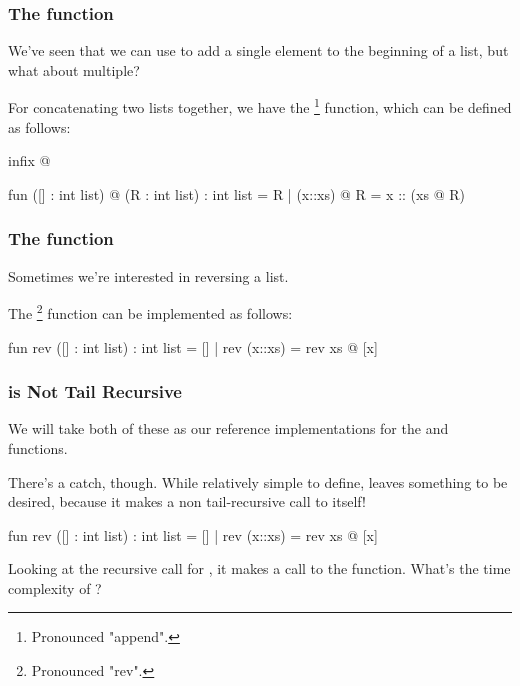 \documentclass[aspectratio=169, handout]{beamer}
\begin{document}


\begin{frame}[fragile]
  \frametitle{The  function}

  We've seen that we can use \code{::} to add a single element to the beginning of a list,
  but what about multiple?

  \pause
  \vspace{\fill}

  For concatenating two lists together, we have the \footnote{Pronounced "append".} function, which
  can be defined as follows:

  \pause
  \begin{codeblock}
    infix @

    fun ([] : int list) @ (R : int list) : int list = R
      | (x::xs) @ R = x :: (xs @ R)
  \end{codeblock}
\end{frame}

\begin{frame}[fragile]
  \frametitle{The  function}

  Sometimes we're interested in reversing a list.

  \pause
  \vspace{\fill}

  The \footnote{Pronounced "rev".} function can be implemented as follows:

  \pause
  \begin{codeblock}
    fun rev ([] : int list) : int list = []
      | rev (x::xs) = rev xs @ [x]
  \end{codeblock}
\end{frame}

\begin{frame}[fragile]
  \frametitle{ is Not Tail Recursive}

  We will take both of these as our reference implementations for the  and 
  functions.

  \pause
  \vspace{\fill}

  There's a catch, though. While relatively simple to define,  leaves something to be
  desired, because it makes a non tail-recursive call to itself!

  \begin{codeblock}
    fun rev ([] : int list) : int list = []
      | rev (x::xs) = rev xs @ [x]
  \end{codeblock}

  \pause
  \vspace{\fill}

  Looking at the recursive call for , it makes a call to the  function. What's
  the time complexity of ?
\end{frame}
\end{document}
